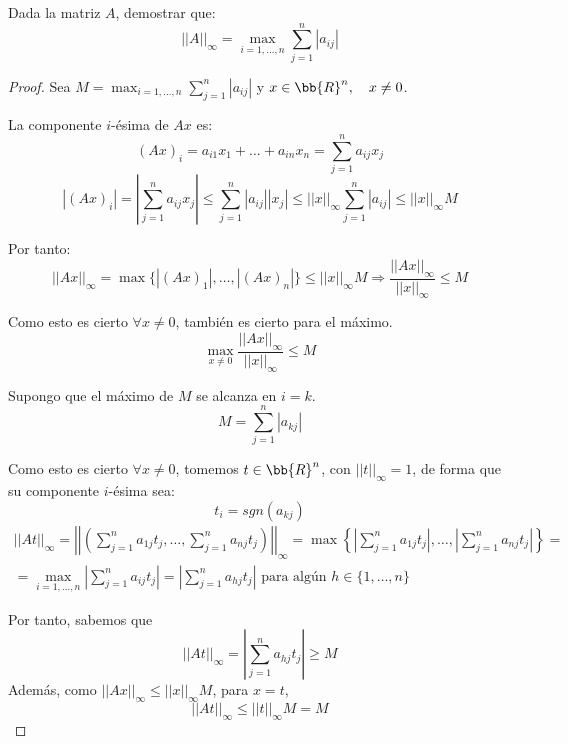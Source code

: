\begin{prop}
    Dada la matriz $A$, demostrar que:
    $$||A||_\infty = \max_{i=1,\dots,n} \sum_{j=1}^n |a_{ij}|$$
    \begin{proof}
        Sea $\displaystyle M=\max_{i=1,\dots,n} \sum_{j=1}^n |a_{ij}|$ y $x \in \bb{R}^n, \quad x\neq 0$.

        La componente $i$-ésima de $Ax$ es:
        $$(Ax)_{i} = a_{i1}x_1 + \dots + a_{in}x_n = \sum_{j=1}^na_{ij}x_j$$
        \begin{equation*}
            |(Ax)_{i}| = \left| \sum_{j=1}^na_{ij}x_j\right| \leq 
            \sum_{j=1}^n |a_{ij}||x_j| \leq ||x||_\infty \sum_{j=1}^n |a_{ij}| \leq  ||x||_\infty M
        \end{equation*}

        Por tanto:
        \begin{equation*}
            ||Ax||_\infty = \max\{|(Ax)_1|, \dots, |(Ax)_n|\} \leq ||x||_\infty M \Longrightarrow \frac{||Ax||_\infty}{||x||_\infty} \leq M
        \end{equation*}

        Como esto es cierto $\forall x\neq 0$, también es cierto para el máximo.
        \begin{equation}\label{DemosNormaMatriz2}
            \max_{x\neq 0} \frac{||Ax||_\infty}{||x||_\infty} \leq M
        \end{equation}

        Supongo que el máximo de $M$ se alcanza en $i=k$.
        $$M = \sum_{j=1}^n |a_{kj}|$$

        Como esto es cierto $\forall x\neq 0$, tomemos $t \in \bb{R}^n$, con $||t||_\infty=1$, de forma que su componente $i$-ésima sea:
        $$t_i = sgn(a_{kj})$$
        \begin{multline*}
            ||At||_\infty = \left|\left|\left(\sum_{j=1}^na_{1j}t_j, \dots, \sum_{j=1}^na_{nj}t_j\right)\right|\right|_\infty = \max \left\{\left|\sum_{j=1}^na_{1j}t_j\right|, \dots, \left|\sum_{j=1}^na_{nj}t_j\right|\right\} = \\=   \max_{i=1,\dots,n} \left|\sum_{j=1}^na_{ij}t_j\right|
            = \left|\sum_{j=1}^na_{hj}t_j\right|
            \text{ para algún } h\in\{1,\dots, n\}
        \end{multline*}

        Por tanto, sabemos que
        \begin{equation}\label{Desigualdad1}
            ||At||_\infty = \left|\sum_{j=1}^na_{hj}t_j\right| \geq M
        \end{equation}
        Además, como $||Ax||_\infty \leq ||x||_\infty M$, para $x=t$,
        \begin{equation}\label{Desigualdad2}
            ||At||_\infty \leq ||t||_\infty M = M
        \end{equation}


\end{proof}
\end{prop}
